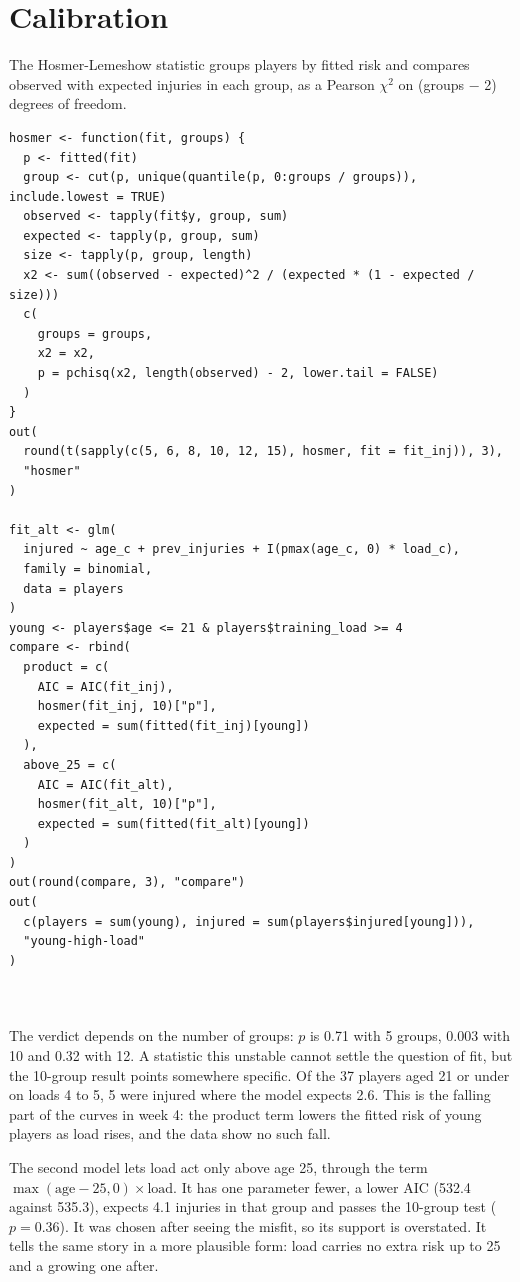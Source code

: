 \documentclass[12pt,notitlepage]{report}
\begin{document}
\section{Calibration}

The Hosmer-Lemeshow statistic groups players by fitted risk and compares
observed with expected injuries in each group, as a Pearson $\chi^2$ on
(groups $-$ 2) degrees of freedom.

\begin{verbatim}
hosmer <- function(fit, groups) {
  p <- fitted(fit)
  group <- cut(p, unique(quantile(p, 0:groups / groups)), include.lowest = TRUE)
  observed <- tapply(fit$y, group, sum)
  expected <- tapply(p, group, sum)
  size <- tapply(p, group, length)
  x2 <- sum((observed - expected)^2 / (expected * (1 - expected / size)))
  c(
    groups = groups,
    x2 = x2,
    p = pchisq(x2, length(observed) - 2, lower.tail = FALSE)
  )
}
out(
  round(t(sapply(c(5, 6, 8, 10, 12, 15), hosmer, fit = fit_inj)), 3),
  "hosmer"
)

fit_alt <- glm(
  injured ~ age_c + prev_injuries + I(pmax(age_c, 0) * load_c),
  family = binomial,
  data = players
)
young <- players$age <= 21 & players$training_load >= 4
compare <- rbind(
  product = c(
    AIC = AIC(fit_inj),
    hosmer(fit_inj, 10)["p"],
    expected = sum(fitted(fit_inj)[young])
  ),
  above_25 = c(
    AIC = AIC(fit_alt),
    hosmer(fit_alt, 10)["p"],
    expected = sum(fitted(fit_alt)[young])
  )
)
out(round(compare, 3), "compare")
out(
  c(players = sum(young), injured = sum(players$injured[young])),
  "young-high-load"
)
\end{verbatim}

\inputminted{text}{output/hosmer.txt}
\inputminted{text}{output/young-high-load.txt}
\inputminted{text}{output/compare.txt}

The verdict depends on the number of groups: $p$ is 0.71 with 5 groups,
0.003 with 10 and 0.32 with 12. A statistic this unstable cannot settle the
question of fit, but the 10-group result points somewhere specific. Of the 37
players aged 21 or under on loads 4 to 5, 5 were injured where the model
expects 2.6. This is the falling part of the curves in week 4: the product
term lowers the fitted risk of young players as load rises, and the data show
no such fall.

The second model lets load act only above age 25, through the term
$\max(\text{age} - 25, 0) \times \text{load}$. It has one parameter fewer, a
lower AIC (532.4 against 535.3), expects 4.1 injuries in that group and
passes the 10-group test ($p = 0.36$). It was chosen after seeing the misfit,
so its support is overstated. It tells the same story in a more plausible
form: load carries no extra risk up to 25 and a growing one after.
\end{document}
